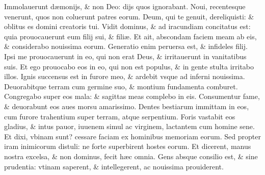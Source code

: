 \documentclass[a5paper,10pt]{book}
\def\ae{æ}
\begin{document}
\begin{multicols*}{2}
\newline \color{red} I\color{black}mmolauerunt d\ae monijs, \& non Deo: dijs quos ignorabant.
\newline \color{red} N\color{black}oui, recentesque venerunt, quos non coluerunt patres eorum.
\newline \color{red} D\color{black}eum, qui te genuit, dereliquisti: \& oblitus es domini creatoris tui.
\newline \color{red} V\color{black}idit dominus, \& ad iracundiam concitatus est: quia prouocauerunt eum filij sui, \& fili\ae .
\newline \color{red} E\color{black}t ait, abscondam faciem meam ab eis, \& considerabo nouissima eorum.
\newline \color{red} G\color{black}eneratio enim peruersa est, \& infideles filij.
\newline \color{red} I\color{black}psi me prouocauerunt in eo, qui non erat Deus, \& irritauerunt in vanitatibus suis.
\newline \color{red} E\color{black}t ego prouocabo eos in eo, qui non est populus, \& in gente stulta irritabo illos.
\newline \color{red} I\color{black}gnis succensus est in furore meo, \& ardebit vsque ad inferni nouissima.
\newline \color{red} D\color{black}euorabitque terram cum germine suo, \& montium fundamenta comburet.
\newline \color{red} C\color{black}ongregabo super eos mala: \& sagittas meas complebo in eis.
\newline \color{red} C\color{black}onsumentur fame, \& deuorabunt eos aues morsu amarissimo.
\newline \color{red} D\color{black}entes bestiarum immittam in eos, cum furore trahentium super terram, atque serpentium.
\newline \color{red} F\color{black}oris vastabit eos gladius, \& intus pauor, iuuenem simul ac virginem, lactantem cum homine sene.
\newline \color{red} E\color{black}t dixi, vbinam sunt? cessare faciam ex hominibus memoriam eorum.%
\newline \color{red} S\color{black}ed propter iram inimicorum distuli: ne forte superbirent hostes eorum.
\newline \color{red} E\color{black}t dicerent, manus nostra excelsa, \& non dominus, fecit h\ae c omnia.
\newline \color{red} G\color{black}ens absque consilio est, \& sine prudentia: vtinam saperent, \& intellegerent, ac nouissima prouiderent.

\end{multicols*}
\end{document}
